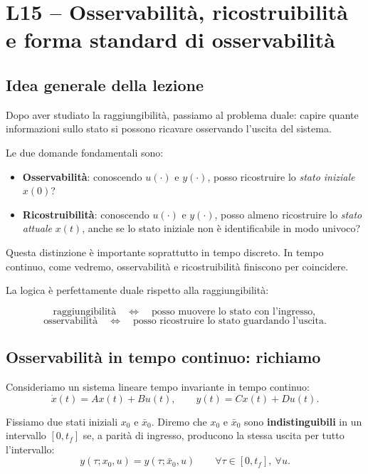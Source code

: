 \chapter{L15 -- Osservabilità, ricostruibilità e forma standard di osservabilità}

\section{Idea generale della lezione}

Dopo aver studiato la raggiungibilità, passiamo al problema duale: capire quante informazioni sullo stato si possono ricavare osservando l'uscita del sistema.

Le due domande fondamentali sono:

\begin{itemize}
    \item \textbf{Osservabilità}: conoscendo \(u(\cdot)\) e \(y(\cdot)\), posso ricostruire lo \emph{stato iniziale} \(x(0)\)?
    \item \textbf{Ricostruibilità}: conoscendo \(u(\cdot)\) e \(y(\cdot)\), posso almeno ricostruire lo \emph{stato attuale} \(x(t)\), anche se lo stato iniziale non è identificabile in modo univoco?
\end{itemize}

Questa distinzione è importante soprattutto in tempo discreto.  
In tempo continuo, come vedremo, osservabilità e ricostruibilità finiscono per coincidere.

\bigskip

La logica è perfettamente duale rispetto alla raggiungibilità:

\[
\text{raggiungibilità} \quad \Longleftrightarrow \quad \text{posso muovere lo stato con l'ingresso},
\]
\[
\text{osservabilità} \quad \Longleftrightarrow \quad \text{posso ricostruire lo stato guardando l'uscita}.
\]

\section{Osservabilità in tempo continuo: richiamo}

Consideriamo un sistema lineare tempo invariante in tempo continuo:
\[
\dot x(t)=Ax(t)+Bu(t),\qquad y(t)=Cx(t)+Du(t).
\]

Fissiamo due stati iniziali \(x_0\) e \(\bar x_0\).  
Diremo che \(x_0\) e \(\bar x_0\) sono \textbf{indistinguibili} in un intervallo \([0,t_f]\) se, a parità di ingresso, producono la stessa uscita per tutto l'intervallo:
\[
y(\tau; x_0,u)=y(\tau; \bar x_0,u)
\qquad
\forall \tau\in[0,t_f],\ \forall u.
\]

